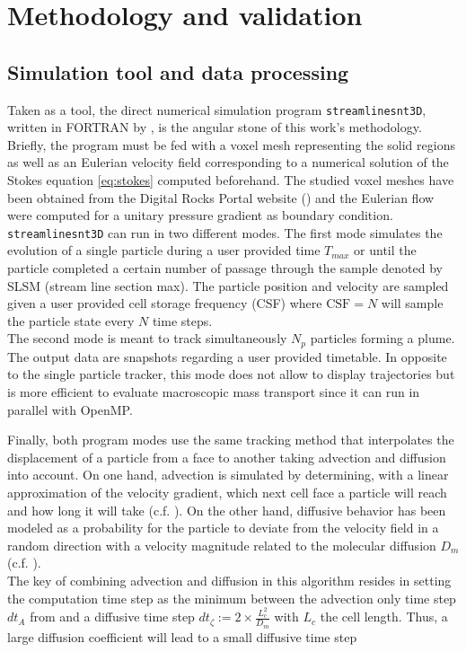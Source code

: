 \chapter{Methodology and validation}
\section{Simulation tool and data processing}
Taken as a tool, the direct numerical simulation program \texttt{streamlinesnt3D}, written in \textsc{FORTRAN} by \citet{Meyer2017}, is the angular stone of this work's methodology. 
Briefly, the program must be fed with a voxel mesh representing the solid regions as well as an Eulerian velocity field corresponding to a numerical solution of the Stokes equation \eqref{eq:stokes} computed beforehand.
The studied voxel meshes have been obtained from the Digital Rocks Portal website (\citet{digitalrocksportal}) and the Eulerian flow were computed for a unitary pressure gradient as boundary condition.\\
\texttt{streamlinesnt3D} can run in two different modes.
The first mode simulates the evolution of a single particle during a user provided time $T_{max}$ or until the particle completed a certain number of passage through the sample denoted by SLSM (stream line section max). 
The particle position and velocity are sampled given a user provided cell storage frequency (CSF) where $\mathrm{CSF}=N$ will sample the particle state every $N$ time steps.\\
The second mode is meant to track simultaneously $N_p$ particles forming a plume. The output data are snapshots regarding a user provided timetable. 
In opposite to the single particle tracker, this mode does not allow to display trajectories but is more efficient to evaluate macroscopic mass transport since it can run in parallel with OpenMP.

Finally, both program modes use the same tracking method that interpolates the displacement of a particle from a face to another taking advection and diffusion into account.
On one hand, advection is simulated by determining, with a linear approximation of the velocity gradient, which next cell face a particle will reach and how long it will take (c.f. \cite{Pollock1988}).
On the other hand, diffusive behavior has been modeled as a probability for the particle to deviate from the velocity field in a random direction with a velocity magnitude related to the molecular diffusion $D_m$ (c.f. \citet{Meyer2017}).\\
The key of combining advection and diffusion in this algorithm resides in setting the computation time step as the minimum between the advection only time step $dt_A$ from \citet{Pollock1988} and a diffusive time step $dt_\zeta:=2\times\frac{L_c^2}{D_m}$ with $L_c$ the cell length.
Thus, a large diffusion coefficient will lead to a small diffusive time step 

